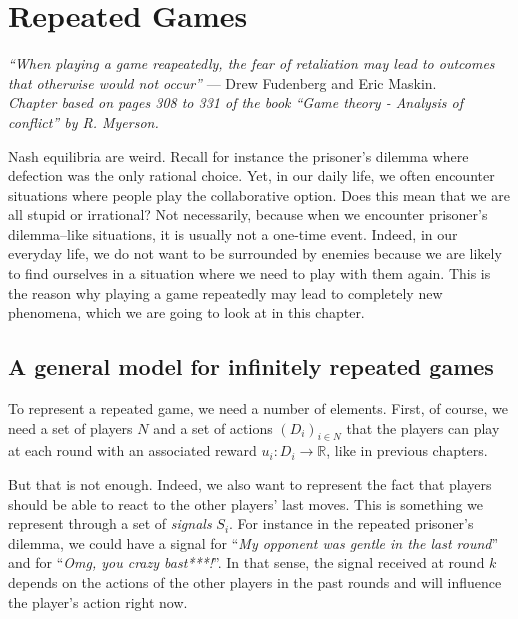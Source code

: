 \ifx \globalmark \undefined %
	
\else 	
\fi




\chapter{Repeated Games}
{\large{\itshape
``When playing a game reapeatedly, the fear of retaliation may lead to outcomes that otherwise would not occur''} --- Drew Fudenberg and Eric Maskin.\\
}
\label{chap:Rep}
{\small{\itshape
Chapter based on pages 308 to 331 of the book  ``Game theory - Analysis of conflict'' by R. Myerson.}\\
}


Nash equilibria are weird. Recall for instance the prisoner's dilemma where defection was the only rational choice. Yet, in our daily life, we often encounter situations where people play the collaborative option. Does this mean that we are all stupid or irrational? Not necessarily, because when we encounter prisoner's dilemma--like situations, it is usually not a one-time event. Indeed, in our everyday life, we do not want to be surrounded by enemies because we are likely to find ourselves in a situation where we need to play with them again. This is the reason why playing a game repeatedly may lead to completely new phenomena, which we are going to look at in this chapter.


%
%
%
%



\section{A general model for infinitely repeated games}



To represent a repeated game, we need a number of elements. First, of course, we need a set of players $N$ and a set of actions $(D_i)_{i \in N}$ that the players can play at each round with an associated reward $u_i: D_i \rightarrow \mathbb{R}$, like in previous chapters. 

But that is not enough. Indeed, we also want to represent the fact that players should be able to react to the other players' last moves. This is something we represent through a set of \emph{signals} $S_i$. For instance in the repeated prisoner's dilemma, we could have a signal for ``\emph{My opponent was gentle in the last round}'' and for ``\emph{Omg, you crazy bast***!}''. In that sense, the signal received at round $k$ depends on the actions of the other players in the past rounds and will influence the player's action right now. 

